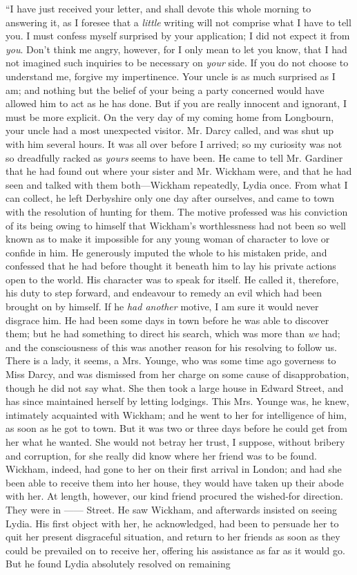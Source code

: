 \documentclass[12pt]{book}
\begin{document}
``I have just received your letter, and shall devote this whole morning to answering it, as I foresee that a \textit{little} writing will not comprise what I have to tell you. I must confess myself surprised by your application; I did not expect it from \textit{you}. Don't think me angry, however, for I only mean to let you know, that I had not imagined such inquiries to be necessary on \textit{your} side. If you do not choose to understand me, forgive my impertinence. Your uncle is as much surprised as I am; and nothing but the belief of your being a party concerned would have allowed him to act as he has done. But if you are really innocent and ignorant, I must be more explicit. On the very day of my coming home from Longbourn, your uncle had a most unexpected visitor. Mr. Darcy called, and was shut up with him several hours. It was all over before I arrived; so my curiosity was not so dreadfully racked as \textit{yours} seems to have been. He came to tell Mr. Gardiner that he had found out where your sister and Mr. Wickham were, and that he had seen and talked with them both---Wickham repeatedly, Lydia once. From what I can collect, he left Derbyshire only one day after ourselves, and came to town with the resolution of hunting for them. The motive professed was his conviction of its being owing to himself that Wickham's worthlessness had not been so well known as to make it impossible for any young woman of character to love or confide in him. He generously imputed the whole to his mistaken pride, and confessed that he had before thought it beneath him to lay his private actions open to the world. His character was to speak for itself. He called it, therefore, his duty to step forward, and endeavour to remedy an evil which had been brought on by himself. If he \textit{had another} motive, I am sure it would never disgrace him. He had been some days in town before he was able to discover them; but he had something to direct his search, which was more than \textit{we} had; and the consciousness of this was another reason for his resolving to follow us. There is a lady, it seems, a Mrs. Younge, who was some time ago governess to Miss Darcy, and was dismissed from her charge on some cause of disapprobation, though he did not say what. She then took a large house in Edward Street, and has since maintained herself by letting lodgings. This Mrs. Younge was, he knew, intimately acquainted with Wickham; and he went to her for intelligence of him, as soon as he got to town. But it was two or three days before he could get from her what he wanted. She would not betray her trust, I suppose, without bribery and corruption, for she really did know where her friend was to be found. Wickham, indeed, had gone to her on their first arrival in London; and had she been able to receive them into her house, they would have taken up their abode with her. At length, however, our kind friend procured the wished-for direction. They were in ------ Street. He saw Wickham, and afterwards insisted on seeing Lydia. His first object with her, he acknowledged, had been to persuade her to quit her present disgraceful situation, and return to her friends as soon as they could be prevailed on to receive her, offering his assistance as far as it would go. But he found Lydia absolutely resolved on remaining 
\end{document}
